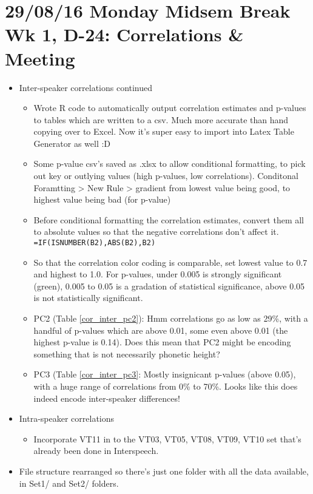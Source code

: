 \documentclass{article}
\begin{document}
\section*{29/08/16 Monday Midsem Break Wk 1, D-24: Correlations \& Meeting}
\begin{itemize}
    \item Inter-speaker correlations continued
    \begin{itemize}
        \item Wrote R code to automatically output correlation estimates and p-values to tables which are written to a csv. Much more accurate than hand copying over to Excel. Now it's super easy to import into Latex Table Generator as well :D
        \item Some p-value csv's saved as .xlsx to allow conditional formatting, to pick out key or outlying values (high p-values, low correlations). Conditonal Foramtting > New Rule > gradient from lowest value being good, to highest value being bad (for p-value)
        \item Before conditional formatting the correlation estimates, convert them all to absolute values so that the negative correlations don't affect it. 
        \verb|=IF(ISNUMBER(B2),ABS(B2),B2)|
        \item So that the correlation color coding is comparable, set lowest value to 0.7 and highest to 1.0. For p-values, under 0.005 is strongly significant (green), 0.005 to 0.05 is a gradation of statistical significance, above 0.05 is not statistically significant.
        \item PC2 (Table \ref{cor_inter_pc2}): Hmm correlations go as low as 29\%, with a handful of p-values which are above 0.01, some even above 0.01 (the highest p-value is 0.14). Does this mean that PC2 might be encoding something that is not necessarily phonetic height?
        \item PC3 (Table \ref{cor_inter_pc3}: Mostly insignicant p-values (above 0.05), with a huge range of correlations from 0\% to 70\%. Looks like this does indeed encode inter-speaker differences!
    \end{itemize}
    \item Intra-speaker correlations
    \begin{itemize}
        \item Incorporate VT11 in to the VT03, VT05, VT08, VT09, VT10 set that's already been done in Interspeech.
        \end{itemize}
        \item File structure rearranged so there's just one folder with all the data available, in Set1/ and Set2/ folders.

\end{itemize}
\end{document}
